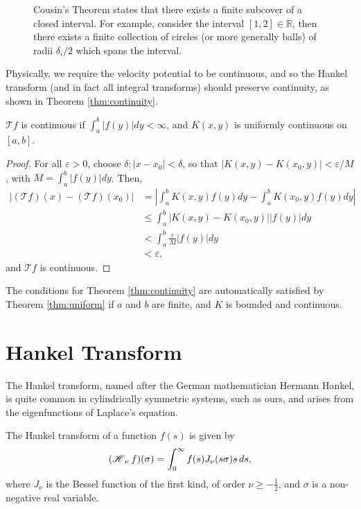 \begin{figure}[!p]
\centering

\caption[Cousin's Theorem Depiction]{Cousin's Theorem states that there exists a finite subcover of a closed interval. For example, consider the interval $[1,2] \in \mathbb{R}$, then there exists a finite collection of circles (or more generally balls) of radii $\delta_i/2$ which spans the interval.}
\label{fig:arrows}
\end{figure}

Physically, we require the velocity potential to be continuous, and so the Hankel transform (and in fact all integral transforms) should preserve continuity, as shown in Theorem \ref{thm:continuity}.

\begin{theorem}
\label{thm:continuity}
$\mathcal{T}f$ is continuous if $\int_a^b |f(y)| dy < \infty$, and $K(x,y)$ is uniformly continuous on $[a,b]$.
\end{theorem}
\begin{proof}
For all $\varepsilon > 0$, choose $\delta : |x - x_0| < \delta$, so that $|K(x,y) - K(x_0,y)| < \varepsilon/M$, with $M = \int_a^b |f(y)| dy$. Then,
\begin{align*}
|(\mathcal{T}f)(x) - (\mathcal{T}f)(x_0)| &= \left| \int_a^b K(x,y)f(y) dy - \int_a^b K(x_0,y)f(y) dy \right| \\
&\leq \int_a^b |K(x,y) - K(x_0,y)||f(y)| dy \\
&< \int_a^b \frac{\varepsilon}{M} |f(y)| dy \\
&< \varepsilon,
\end{align*}
and $\mathcal{T}f$ is continuous.
\end{proof}

The conditions for Theorem \ref{thm:continuity} are automatically satisfied by Theorem \ref{thm:uniform} if $a$ and $b$ are finite, and $K$ is bounded and continuous.

\section{Hankel Transform}

The Hankel transform, named after the German mathematician Hermann Hankel, is quite common in cylindrically symmetric systems, such as ours, and arises from the eigenfunctions of Laplace's equation.

\begin{definition}
\label{def:hanktrans}
The Hankel transform of a function $f(s)$ is given by
\begin{align*}
\Hank[\nu]{f}(\sigma) = \int_0^\infty f(s) J_\nu(s \sigma) s \, ds,
\end{align*}
where $J_\nu$ is the Bessel function of the first kind, of order $\nu \geq -\frac{1}{2}$, and $\sigma$ is a non-negative real variable.
\end{definition}

